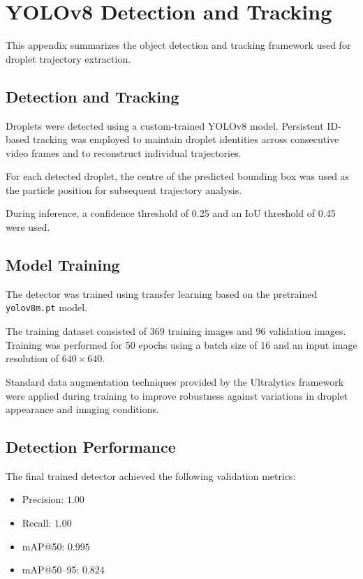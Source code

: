 \appendix

\chapter{YOLOv8 Detection and Tracking}
\label{app:yolo_parameters}

This appendix summarizes the object detection and tracking framework used for droplet trajectory extraction.

\section{Detection and Tracking}

Droplets were detected using a custom-trained YOLOv8 model. Persistent ID-based tracking was employed to maintain droplet identities across consecutive video frames and to reconstruct individual trajectories.

For each detected droplet, the centre of the predicted bounding box was used as the particle position for subsequent trajectory analysis.

During inference, a confidence threshold of 0.25 and an IoU threshold of 0.45 were used.

\section{Model Training}

The detector was trained using transfer learning based on the pretrained \texttt{yolov8m.pt} model.

The training dataset consisted of 369 training images and 96 validation images. Training was performed for 50 epochs using a batch size of 16 and an input image resolution of \(640\times640\).

Standard data augmentation techniques provided by the Ultralytics framework were applied during training to improve robustness against variations in droplet appearance and imaging conditions.

\section{Detection Performance}

The final trained detector achieved the following validation metrics:

\begin{itemize}
    \item Precision: \(1.00\)
    \item Recall: \(1.00\)
    \item mAP@50: \(0.995\)
    \item mAP@50--95: \(0.824\)
\end{itemize}

